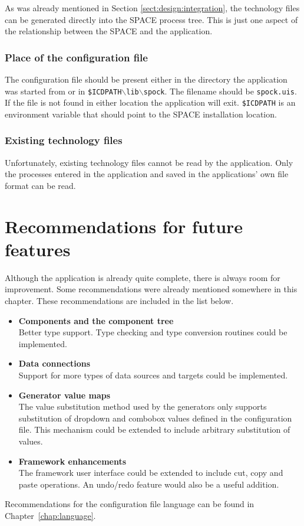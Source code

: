 As was already mentioned in Section \ref{sect:design:integration}, the
technology files can be generated directly into the SPACE process tree. This is
just one aspect of the relationship between the SPACE and the application.

\subsubsection*{Place of the configuration file}
The configuration file should be present either in the directory the
application was started from or in
\texttt{\$ICDPATH$\backslash$lib$\backslash$spock}. The filename should be
\verb=spock.uis=. If the file is not found in either location the application
will exit. \texttt{\$ICDPATH} is an environment variable that should point to
the SPACE installation location.

\subsubsection*{Existing technology files}
Unfortunately, existing technology files cannot be read by the application.
Only the processes entered in the application and saved in the applications'
own file format can be read.

\section{Recommendations for future features} \label{sect:design:future}
Although the application is already quite complete, there is always room for
improvement. Some recommendations were already mentioned somewhere in this
chapter. These recommendations are included in the list below.

\begin{itemize}
\item \textbf{Components and the component tree} \\ Better type support. Type
checking and type conversion routines could be implemented.
\item \textbf{Data connections} \\ Support for more types of data sources and
targets could be implemented.
\item \textbf{Generator value maps} \\ The value substitution method used by
the generators only supports substitution of dropdown and combobox values
defined in the configuration file. This mechanism could be extended to include
arbitrary substitution of values.
\item \textbf{Framework enhancements} \\ The framework user interface could be
extended to include cut, copy and paste operations. An undo/redo feature would
also be a useful addition.
\end{itemize}
\noindent Recommendations for the configuration file language can be found in
\mbox{Chapter \ref{chap:language}.}

